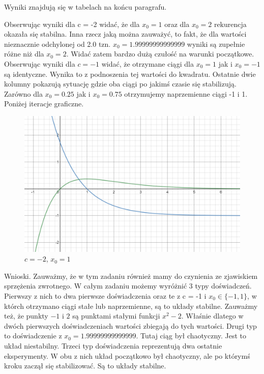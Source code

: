 \documentclass[]{article}
\begin{document}
	Wyniki znajdują się w tabelach na końcu paragrafu.
	
	

	Obserwując wyniki dla c = -2 widać, że dla $x_0 = 1$ oraz dla $x_0 = 2$ rekurencja okazała się stabilna. Inna rzecz jaką można zauważyć, to fakt, że dla wartości nieznacznie odchylonej od 2.0 tzn. $x_0 = 1.99999999999999$ wyniki są zupełnie różne niż dla $x_0 = 2$. Widać zatem bardzo dużą czułość na warunki początkowe. Obserwując wyniki dla $c = -1$ widać, że otrzymane ciągi dla $x_0 = 1$ jak i $x_0 = -1$ są identyczne. Wynika to z podnoszenia tej wartości do kwadratu. Ostatnie dwie kolumny pokazują sytuację gdzie oba ciągi po jakimś czasie się stabilizują. Zarówno dla $x_0 = 0.25$ jak i $x_0 = 0.75$ otrzymujemy naprzemienne ciągi -1 i 1. Poniżej iteracje graficzne.
	

\begin{figure}[!htbp]
	\includegraphics[scale=1]{e1-x-1andxe-x.png}
	\centering
	\caption{$c = -2$, $x_0 = 1$}
\end{figure}

Wnioski. Zauważmy, że w tym zadaniu również mamy do czynienia ze zjawiskiem sprzężenia zwrotnego. W całym zadaniu możemy wyróżnić 3 typy doświadczeń. Pierwszy z nich to dwa pierwsze doświadczenia oraz te z c = -1 i $x_0 \in \{-1,1\}$, w którch otrzymano ciągi stałe lub naprzemienne, są to układy stabilne. Zauważmy też, że punkty $-1$ i $2$ są punktami stałymi funkcji $x^2 - 2$. Właśnie dlatego w dwóch pierwszych doświadczeniach wartości zbiegają do tych wartości. Drugi typ to doświadczenie z $x_0 = 1.99999999999999$. Tutaj ciąg był chaotyczny. Jest to układ niestabilny. Trzeci typ doświadczenia reprezentują dwa ostatnie eksperymenty. W obu z nich układ początkowo był chaotyczny, ale po którymś kroku zaczął się stabilizować. Są to układy stabilne.
\end{document}
